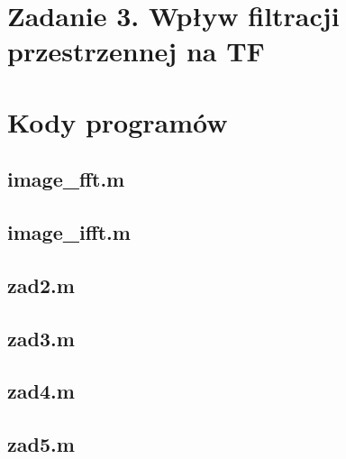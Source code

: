 





 


\section*{Zadanie 3. Wpływ filtracji przestrzennej na TF}







\newpage \section*{Kody programów}

\subsection*{image\_fft.m     }
\subsection*{image\_ifft.m    } \newpage
\subsection*{zad2.m           } \newpage
\subsection*{zad3.m           } \newpage
\subsection*{zad4.m           } \newpage
\subsection*{zad5.m           } \newpage









